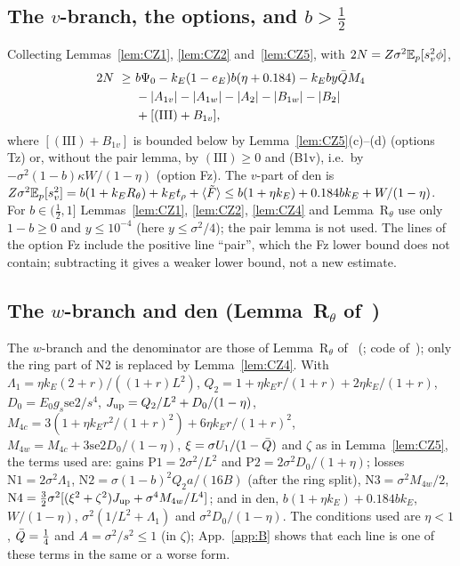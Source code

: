 \subsection{The $v$-branch, the options, and $b>\frac12$}
\label{app:A:sum}

Collecting Lemmas~\ref{lem:CZ1}, \ref{lem:CZ2} and~\ref{lem:CZ5}, with $2N=Z\sigma^2\mathbb{E}_p[s_v^2\phi]$,
\begin{equation}
\begin{split}
2N\ \ge\ &b\Psi_0-k_E(1-e_E)b(\eta+0.184)-k_Eby\bar Q M_4\\&-|A_{1v}|-|A_{1w}|-|A_2|-|B_{1w}|-|B_2|\\&+[\mathrm{(III)}+B_{1v}],
\end{split}
\end{equation}
where $[\mathrm{(III)}+B_{1v}]$ is bounded below by Lemma~\ref{lem:CZ5}(c)--(d) (options Tz) or, without the pair lemma, by $\mathrm{(III)}\ge0$ and (B1v), i.e.\ by $-\sigma^2(1-b)\kappa W/(1-\eta)$ (option Fz).
The $v$-part of den is $Z\sigma^2\mathbb{E}_p[s_v^2]=b(1+k_ER_\theta)+k_Et_\rho+\langle\tilde F\rangle\le b(1+\eta k_E)+0.184bk_E+W/(1-\eta)$.
For $b\in(\frac12,1]$ Lemmas~\ref{lem:CZ1}, \ref{lem:CZ2}, \ref{lem:CZ4} and Lemma~R$_\theta$ use only $1-b\ge0$ and $y\le10^{-4}$ (here $y\le\sigma^2/4$); the pair lemma is not used. The lines of the option Fz include the positive line ``pair'', which the Fz lower bound does not contain; subtracting it gives a weaker lower bound, not a new estimate.

\subsection{The $w$-branch and den (Lemma~R$_\theta$ of~\cite{H})}
\label{app:A:w}

The $w$-branch and the denominator are those of Lemma~R$_\theta$ of~\cite{H} (; code  of~\cite{H}); only the ring part of N2 is replaced by Lemma~\ref{lem:CZ4}.
With $\Lambda_1=\eta k_E(2+r)/((1+r)L^2)$, $Q_2=1+\eta k_Er/(1+r)+2\eta k_E/(1+r)$, $D_0=E_0g_s\mathrm{se2}/s^4$, $J_{\rm up}=Q_2/L^2+D_0/(1-\eta)$, $M_{4c}=3(1+\eta k_Er^2/(1+r)^2)+6\eta k_Er/(1+r)^2$, $M_{4w}=M_{4c}+3\mathrm{se2}D_0/(1-\eta)$, $\xi=\sigma U_1/(1-\bar Q)$ and $\zeta$ as in Lemma~\ref{lem:CZ5}, the terms used are:
gains $\mathrm{P1}=2\sigma^2/L^2$ and $\mathrm{P2}=2\sigma^2D_0/(1+\eta)$; losses $\mathrm{N1}=2\sigma^2\Lambda_1$, $\mathrm{N2}=\sigma(1-b)^2Q_2a/(16B)$ (after the ring split), $\mathrm{N3}=\sigma^2M_{4w}/2$, $\mathrm{N4}=\tfrac32\sigma^2[(\xi^2+\zeta^2)J_{\rm up}+\sigma^4M_{4w}/L^4]$; and in den, $b(1+\eta k_E)+0.184bk_E$, $W/(1-\eta)$, $\sigma^2(1/L^2+\Lambda_1)$ and $\sigma^2D_0/(1-\eta)$.
The conditions used are $\eta<1$, $\bar Q=\frac14$ and $A=\sigma^2/s^2\le1$ (in $\zeta$); App.~\ref{app:B} shows that each line is one of these terms in the same or a worse form.

